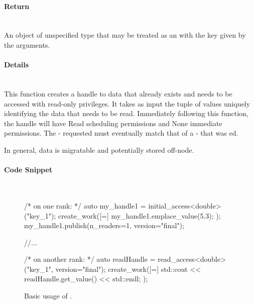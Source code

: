 \paragraph{Return}\mbox{}\\
An object of unspecified type that may be treated as an 
with the key given by the arguments.

\paragraph{Details}\mbox{}\\
This function creates a \gls{handle} to data that already exists and 
needs to be accessed with read-only privileges. 
It takes as input the \gls{tuple} of values uniquely 
identifying the data that needs to be read.
Immediately following this function, the \gls{handle} will have Read
\gls{scheduling permissions} and None \gls{immediate permissions}.
The - requested must eventually match that of a
- that was ed.

In general,  data is migratable and potentially stored off-node.

\paragraph{Code Snippet}\mbox{}\\
\begin{figure}[!h]
\begin{CppCodeNumb}
/* on one rank: */
auto my_handle1 = initial_access<double>("key_1");
create_work([=]{
  my_handle1.emplace_value(5.3);
});
my_handle1.publish(n_readers=1, version="final");

//...

/* on another rank: */
auto readHandle = read_access<double>("key_1", version="final");
create_work([=]{
  std::cout << readHandle.get_value() << std::endl;
});
\end{CppCodeNumb}
\label{fig:fe_api_readaccess}
\caption{Basic usage of \protect{}.}
\end{figure}

